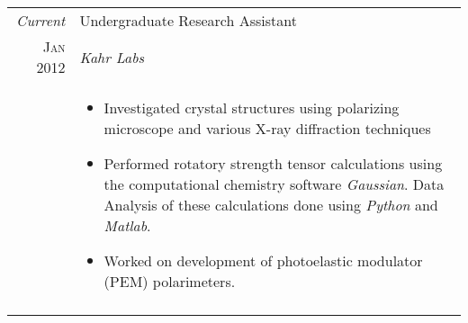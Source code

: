 \documentclass[a4paper,10pt]{article} %
\begin{document}
\begin{tabular}{r|p{11cm}}
\emph{Current} & Undergraduate Research Assistant \\
\textsc{Jan 2012} & \emph{Kahr Labs} \\
& 
\begin{itemize}
\item Investigated crystal structures using polarizing microscope and
  various X-ray diffraction techniques
\item Performed rotatory strength tensor calculations using the
  computational chemistry software \emph{Gaussian}. Data Analysis of these
  calculations done using \emph{Python} and \emph{Matlab}.
\item Worked on development of photoelastic  modulator (PEM) polarimeters.
\end{itemize}
\\
\multicolumn{2}{c}{} \\




 \end{tabular}

\end{document}
